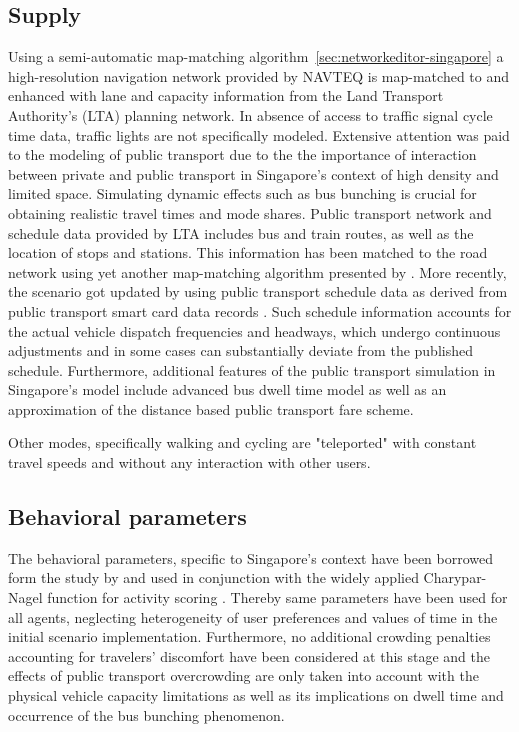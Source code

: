 \subsection{Supply}
Using a semi-automatic map-matching algorithm~\ref{sec:networkeditor-singapore} a high-resolution navigation network provided by NAVTEQ is map-matched to and enhanced with lane and capacity information from the Land Transport Authority's (LTA) planning network. In absence of access to traffic signal cycle time data, traffic lights are not specifically modeled. Extensive attention was paid to the modeling of public transport due to the the importance of interaction between private and public transport in Singapore’s context of high density and limited space. Simulating dynamic effects such as bus bunching is crucial for obtaining realistic travel times and mode shares. Public transport network and schedule data provided by LTA includes bus and train routes,  as well as the location of stops and stations. This information has been matched to the road network using yet another map-matching algorithm presented by \citet[][]{Ordonez_HKSTS_2011, Ordonez_Webpage_2011_4}. More recently, the scenario got updated by using public transport schedule data as derived from public transport smart card data records \citet[][]{Fourie_TechRep_FCL_2014}. Such schedule information accounts for the actual vehicle dispatch frequencies and headways, which undergo continuous adjustments and in some cases can substantially deviate from the published schedule. Furthermore, additional features of the public transport simulation in Singapore’s model include advanced bus dwell time model \citep[][]{SunEtAl_TransResA_2014} as well as an approximation of the distance based public transport fare scheme.

Other modes, specifically walking and cycling are "teleported" with constant travel speeds and without any interaction with other users. 

\subsection{Behavioral parameters}
The behavioral parameters, specific to Singapore's context have been borrowed form the study by \citet[][]{LTA_unpub_2009} and used in conjunction with the widely applied Charypar-Nagel function for activity scoring \citet[][]{CharyparNagel_Transportation_2005}. Thereby same parameters have been used for all agents, neglecting heterogeneity of user preferences and values of time in the initial scenario implementation. Furthermore, no additional crowding penalties accounting for travelers' discomfort have been considered at this stage and the effects of public transport overcrowding are only taken into account with the physical vehicle capacity limitations as well as its implications on dwell time and occurrence of the bus bunching phenomenon. 

